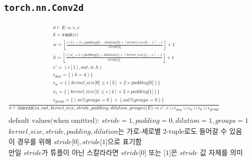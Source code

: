\documentclass{article}
\newcommand{\x}{\times}
\newcommand{\rem}{\mtt{\%}}
\newcommand{\Rar}{\Rightarrow}
\newcommand{\mtt}[1]{\mathtt{#1}}
\newcommand{\op}[2]{\mtt{#1(}#2\mtt{)}}
\newcommand{\module}[3]{\mtt{#1(}#2\mtt{)(}#3\mtt{)}}
\newcommand{\ind}[1]{\mtt{[}#1\mtt{]}}
\begin{document}
\subsection*{\texttt{torch.nn.Conv2d}}%
\begin{align*}
  \frac
  {
    \begin{array}{l}
      \sigma \vdash E \Rar e, c \\
      k = \op{rank}{e} \\
      w = \left\lfloor \frac{e[3] + 2 \x padding \ind{0} - dilation \ind{0}
        \x (kernel\_size \ind{0} - 1) - 1}{stride \ind{0}} \right\rfloor + 1 \\
      h = \left\lfloor \frac{e[4] + 2 \x padding \ind{1} - dilation \ind{1}
        \x (kernel\_size \ind{1} - 1) - 1}{stride \ind{1}} \right\rfloor + 1 \\
      e' = (e[1], out, w, h) \\
      c_{dim} = \{ (k = 4) \} \\
      c_w = \{ (kernel\_size\ind{0} \leq e[3] + 2 \x padding \ind{0}) \} \\
      c_h = \{ (kernel\_size\ind{1} \leq e[4] + 2 \x padding \ind{1}) \} \\
      c_{group} = \{ (in \rem groups = 0) \land (out \rem groups = 0) \}
    \end{array}
  }
  {
    \sigma \vdash \module{Conv2d}{in, out, kernel\_size, stride, padding,
      dilation, groups}{E} \Rar e', c \cup c_{dim} \cup c_w \cup c_h \cup
      c_{group}
  } \\
  \\
  \text{default values(when omitted): $stride=1, padding=0, dilation=1,
    groups=1$} \\
  \text{$kernel\_size, stride, padding, dilation$는 가로-세로별 2-tuple로도 들어갈
  수 있음} \\
  \text{이 경우를 위해 $stride\ind{0}, stride\ind{1}$으로 표기함} \\
  \text{만일 $stride$가 튜플이 아닌 스칼라라면 $stride\ind{0}$ 또는 $\ind{1}$은
    $stride$ 값 자체를 의미}
\end{align*}%
\end{document}
